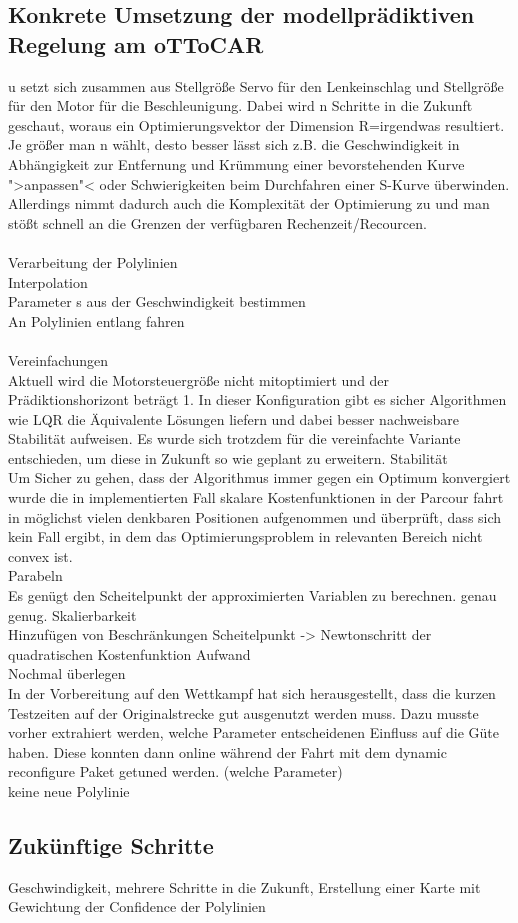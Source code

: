 \subsection{Konkrete Umsetzung der modellprädiktiven Regelung am oTToCAR}
u setzt sich zusammen aus Stellgröße Servo für den Lenkeinschlag und Stellgröße für den Motor für die Beschleunigung. Dabei wird n Schritte in die Zukunft geschaut, woraus ein Optimierungsvektor der Dimension R=irgendwas resultiert. Je größer man n wählt, desto besser lässt sich z.B. die Geschwindigkeit in Abhängigkeit zur Entfernung und Krümmung einer bevorstehenden Kurve ">anpassen"< oder Schwierigkeiten beim Durchfahren einer S-Kurve überwinden. Allerdings nimmt dadurch auch die Komplexität der Optimierung zu und man stößt schnell an die Grenzen der verfügbaren Rechenzeit/Recourcen.\\ \\
Verarbeitung der Polylinien\\
Interpolation\\
Parameter s aus der Geschwindigkeit bestimmen\\
An Polylinien entlang fahren\\ \\
Vereinfachungen\\
Aktuell wird die Motorsteuergröße nicht mitoptimiert und der Prädiktionshorizont beträgt 1. In dieser Konfiguration gibt es sicher Algorithmen wie LQR die Äquivalente Lösungen liefern und dabei besser nachweisbare Stabilität aufweisen. Es wurde sich trotzdem für die vereinfachte Variante entschieden, um diese in Zukunft so wie geplant zu erweitern.
Stabilität\\
Um Sicher zu gehen, dass der Algorithmus immer gegen ein Optimum konvergiert wurde die in implementierten Fall skalare Kostenfunktionen in der Parcour fahrt in möglichst vielen denkbaren Positionen aufgenommen und überprüft, dass sich kein Fall ergibt, in dem das Optimierungsproblem in relevanten Bereich nicht convex ist.
\\
Parabeln
\\
Es genügt den Scheitelpunkt der approximierten Variablen zu berechnen. genau genug.
Skalierbarkeit\\
Hinzufügen von Beschränkungen
Scheitelpunkt -> Newtonschritt der quadratischen Kostenfunktion
Aufwand\\
Nochmal überlegen\\
In der Vorbereitung auf den Wettkampf hat sich herausgestellt, dass die kurzen Testzeiten auf der Originalstrecke gut ausgenutzt werden muss. Dazu musste vorher extrahiert werden, welche Parameter entscheidenen Einfluss auf die Güte haben. Diese konnten dann online während der Fahrt mit dem dynamic reconfigure Paket getuned werden. (welche Parameter)\\
keine neue Polylinie\\
\subsection{Zukünftige Schritte}
Geschwindigkeit, mehrere Schritte in die Zukunft, Erstellung einer Karte mit Gewichtung der Confidence der Polylinien